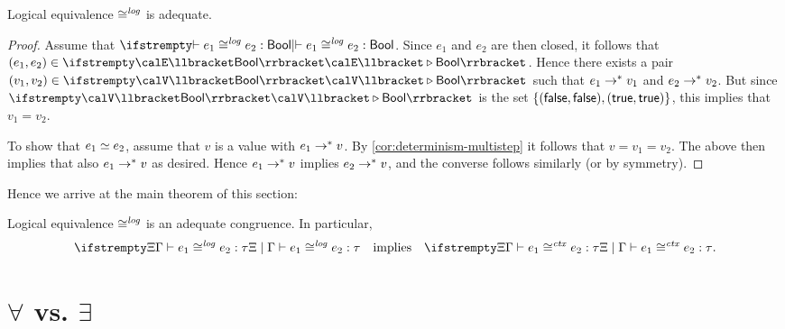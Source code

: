 \begin{lemma}[Adequacy]
    \label{lem:logical-equivalence-adequate}
    Logical equivalence $\cong^{\mathit{log}}$ is adequate.
\end{lemma}

\begin{proof}
    Assume that $\logequiv{}{}{e_1}{e_2}{\typeBool}$. Since $e_1$ and $e_2$ are then closed, it follows that $(e_1,e_2) \in \expInt{}{\typeBool}{}$. Hence there exists a pair $(v_1,v_2) \in \valInt{}{\typeBool}{}$ such that $e_1 \to^* v_1$ and $e_2 \to^* v_2$. But since $\valInt{}{\typeBool}{}$ is the set $\{ (\mathsf{false},\mathsf{false}), (\mathsf{true},\mathsf{true}) \}$, this implies that $v_1 = v_2$.

    To show that $e_1 \simeq e_2$, assume that $v$ is a value with $e_1 \to^* v$. By \cref{cor:determinism-multistep} it follows that $v = v_1 = v_2$. The above then implies that also $e_1 \to^* v$ as desired. Hence $e_1 \to^* v$ implies $e_2 \to^* v$, and the converse follows similarly (or by symmetry).
\end{proof}


Hence we arrive at the main theorem of this section:

\begin{theoremnoproof}
    \label{thm:logical-equivalence-implies-contextual-equivalence}
    Logical equivalence $\cong^{\mathit{log}}$ is an adequate congruence. In particular,
    \begin{equation*}
        \logequiv{\Xi}{\Gamma}{e_1}{e_2}{\tau}
        \quad \text{implies} \quad
        \ctxequiv{\Xi}{\Gamma}{e_1}{e_2}{\tau}.
    \end{equation*}
\end{theoremnoproof}

\section{\texorpdfstring{$\forall$ vs. $\exists$}{Forall vs. exists}}\label{sec:forall-vs-exists}

